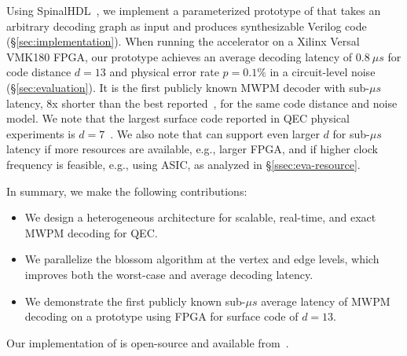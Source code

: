 Using SpinalHDL~\cite{spinalhdlv193}, we implement a parameterized prototype of \system that takes an arbitrary decoding graph as input and produces synthesizable Verilog code (\S\ref{sec:implementation}).
When running the accelerator on a Xilinx Versal VMK180 FPGA, our prototype achieves an average decoding latency of $\qty{0.8}{\mu s}$ for code distance $d=13$ and physical error rate $p=0.1\%$ in a circuit-level noise (\S\ref{sec:evaluation}).
It is the first publicly known MWPM decoder with sub-$\mu s$ latency, 8x shorter than the best reported~\cite{higgott2025sparse}, for the same code distance and noise model.
We note that the largest surface code reported in QEC physical experiments is $d=7$~\cite{acharya2024quantum}.
We also note that \system can support even larger $d$ for sub-$\mu s$ latency if more resources are available, e.g., larger FPGA, and if higher clock frequency is feasible, e.g., using ASIC, as analyzed in \S\ref{ssec:eva-resource}.

\begin{comment}
By solving exact MWPM solutions in sub-$\mu s$ latency, we show that some nontrivial global optimization problems could be solved in real time if they exhibit certain structures and statistical attributes.
We hope that our work inspires other real-time systems to employ advanced algorithms.
\end{comment}

In summary, we make the following contributions:
\begin{itemize}
    \item We design a heterogeneous architecture for scalable, real-time, and exact MWPM decoding for QEC.
    \item We parallelize the blossom algorithm at the vertex and edge levels, which improves both the worst-case and average decoding latency.
    \item We demonstrate the first publicly known sub-$\mu s$ average latency of MWPM decoding on a prototype using FPGA for surface code of $d=13$.
\end{itemize}

Our implementation of \system is open-source and available from~\cite{micro-blossom}.
